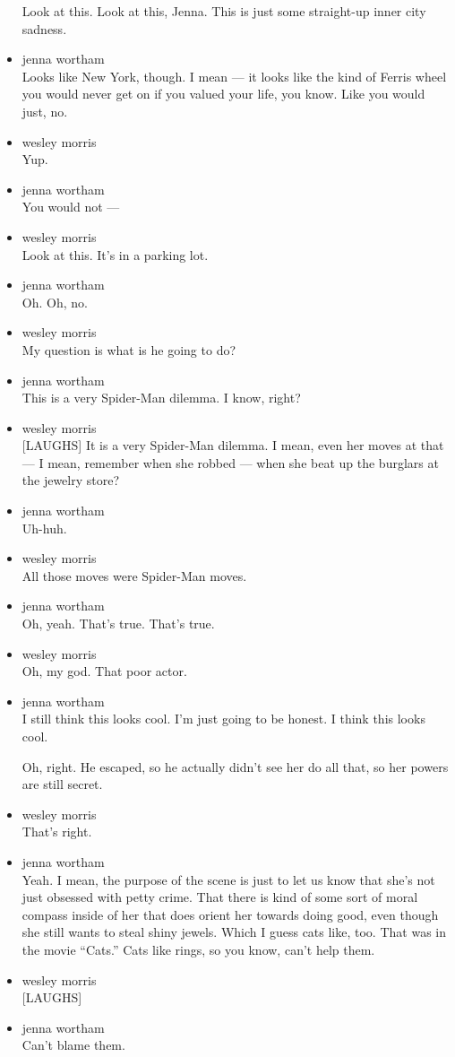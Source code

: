 \begin{itemize}
  Look at this. Look at this, Jenna. This is just some straight-up inner
  city sadness.
\item
  jenna wortham\\
  Looks like New York, though. I mean --- it looks like the kind of
  Ferris wheel you would never get on if you valued your life, you know.
  Like you would just, no.
\item
  wesley morris\\
  Yup.
\item
  jenna wortham\\
  You would not ---
\item
  wesley morris\\
  Look at this. It's in a parking lot.
\item
  jenna wortham\\
  Oh. Oh, no.
\item
  wesley morris\\
  My question is what is he going to do?
\item
  jenna wortham\\
  This is a very Spider-Man dilemma. I know, right?
\item
  wesley morris\\
  {[}LAUGHS{]} It is a very Spider-Man dilemma. I mean, even her moves
  at that --- I mean, remember when she robbed --- when she beat up the
  burglars at the jewelry store?
\item
  jenna wortham\\
  Uh-huh.
\item
  wesley morris\\
  All those moves were Spider-Man moves.
\item
  jenna wortham\\
  Oh, yeah. That's true. That's true.
\item
  wesley morris\\
  Oh, my god. That poor actor.
\item
  jenna wortham\\
  I still think this looks cool. I'm just going to be honest. I think
  this looks cool.

  Oh, right. He escaped, so he actually didn't see her do all that, so
  her powers are still secret.
\item
  wesley morris\\
  That's right.
\item
  jenna wortham\\
  Yeah. I mean, the purpose of the scene is just to let us know that
  she's not just obsessed with petty crime. That there is kind of some
  sort of moral compass inside of her that does orient her towards doing
  good, even though she still wants to steal shiny jewels. Which I guess
  cats like, too. That was in the movie ``Cats.'' Cats like rings, so
  you know, can't help them.
\item
  wesley morris\\
  {[}LAUGHS{]}
\item
  jenna wortham\\
  Can't blame them.


\end{itemize}
